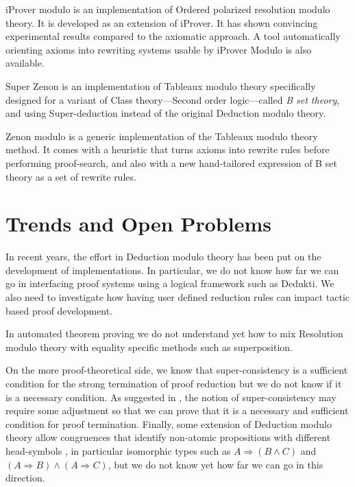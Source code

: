 \documentclass{llncs}
\begin{document}
iProver modulo \cite{Burel11} 
is an implementation of Ordered polarized resolution modulo theory.
It is developed as an extension of iProver.
It has shown convincing experimental results compared to the axiomatic
approach. A tool automatically orienting axioms into rewriting systems
usable by iProver Modulo is also available.


Super Zenon \cite{JBDD} 
is an implementation of Tableaux modulo theory specifically 
designed for a variant of Class theory---Second order logic---called 
{\em B set theory}, and using Super-deduction instead of the original 
Deduction modulo theory.

Zenon modulo \cite{DDGHH1,DDGHH}
is a generic implementation of the Tableaux modulo theory method. 
It comes with a heuristic that turns axioms into rewrite rules before 
performing proof-search, and also with a new hand-tailored expression of 
B set theory as a set of rewrite rules.

\section{Trends and Open Problems}

In recent years, the effort in Deduction modulo theory has been put on the
development of implementations. In particular, we do not know how far we can 
go in interfacing proof systems using a logical framework such as Dedukti.
We also need to investigate how having user defined reduction rules can 
impact tactic based proof development.

In automated theorem proving we do not understand yet how to mix Resolution
modulo theory with equality specific methods such as superposition.

On the more proof-theoretical side, we know that super-consistency is
a sufficient condition for the strong termination of proof reduction
but we do not know if it is a necessary condition. As suggested in
\cite{Cousineau}, the notion of super-consistency may require some
adjustment so that we can prove that it is a necessary and sufficient
condition for proof termination.
Finally, some extension of Deduction modulo theory
allow congruences that identify non-atomic propositions with different 
head-symbols \cite{DD}, in particular isomorphic types such as 
$A \Rightarrow (B \wedge C)$ and $(A \Rightarrow B) \wedge (A \Rightarrow C)$,
but we do not know yet how far we can go in this direction.
\end{document}
